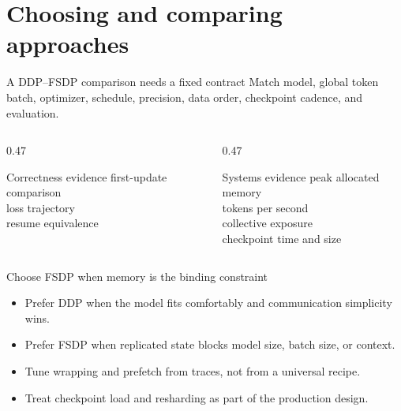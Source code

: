 \documentclass[handout]{beamer}
\begin{document}
\section{Choosing and comparing approaches}

\begin{frame}{A DDP--FSDP comparison needs a fixed contract}
  Match model, global token batch, optimizer, schedule, precision, data order, checkpoint cadence, and evaluation.
  \vspace{7pt}
  \begin{columns}[t]
    \begin{column}{0.47\linewidth}
      \begin{block}{Correctness evidence}
        first-update comparison\\loss trajectory\\resume equivalence
      \end{block}
    \end{column}
    \begin{column}{0.47\linewidth}
      \begin{block}{Systems evidence}
        peak allocated memory\\tokens per second\\collective exposure\\checkpoint time and size
      \end{block}
    \end{column}
  \end{columns}
\end{frame}

\begin{frame}{Choose FSDP when memory is the binding constraint}
  \begin{itemize}
      \setlength{\itemsep}{8pt}
    \item Prefer DDP when the model fits comfortably and communication simplicity wins.
    \item Prefer FSDP when replicated state blocks model size, batch size, or context.
    \item Tune wrapping and prefetch from traces, not from a universal recipe.
    \item Treat checkpoint load and resharding as part of the production design.
  \end{itemize}
\end{frame}
\end{document}
